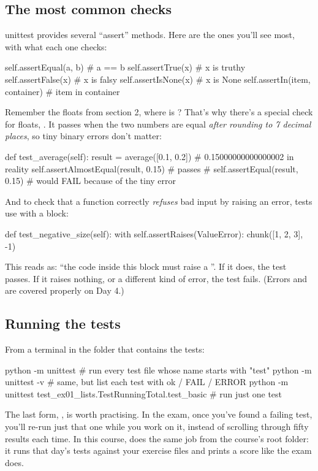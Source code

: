 \documentclass[10pt,a4paper]{article}
\begin{document}
\subsection{The most common checks}
unittest provides several “assert” methods. Here are the ones you’ll see most, with what each one checks:
\begin{pycode}
self.assertEqual(a, b)          # a == b
self.assertTrue(x)              # x is truthy
self.assertFalse(x)             # x is falsy
self.assertIsNone(x)            # x is None
self.assertIn(item, container)  # item in container
\end{pycode}
Remember the floats from section 2, where  is ? That’s why there’s a special check for floats, . It passes when the two numbers are equal \emph{after rounding to 7 decimal places}, so tiny binary errors don’t matter:
\begin{pycode}
def test_average(self):
    result = average([0.1, 0.2])          # 0.15000000000000002 in reality
    self.assertAlmostEqual(result, 0.15)  # passes
    # self.assertEqual(result, 0.15)      # would FAIL because of the tiny error
\end{pycode}
And to check that a function correctly \emph{refuses} bad input by raising an error, tests use  with a  block:
\begin{pycode}
def test_negative_size(self):
    with self.assertRaises(ValueError):
        chunk([1, 2, 3], -1)
\end{pycode}
This reads as: “the code inside this block must raise a ”. If it does, the test passes. If it raises nothing, or a different kind of error, the test fails. (Errors and  are covered properly on Day 4.)
\subsection{Running the tests}
From a terminal in the folder that contains the tests:
\begin{shcode}
python -m unittest                 # run every test file whose name starts with "test"
python -m unittest -v              # same, but list each test with ok / FAIL / ERROR
python -m unittest test_ex01_lists.TestRunningTotal.test_basic   # run just one test
\end{shcode}
The last form, , is worth practising. In the exam, once you’ve found a failing test, you’ll re-run just that one while you work on it, instead of scrolling through fifty results each time.
In this course,  does the same job from the course’s root folder: it runs that day’s tests against your exercise files and prints a score like the exam does.
\end{document}
